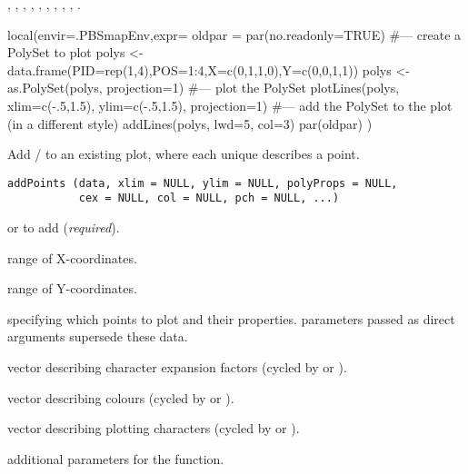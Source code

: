 \documentclass[letterpaper]{book}
\begin{document}
%
\begin{SeeAlso}\relax
{},
,
,
,
,
,
,
,
,
.
\end{SeeAlso}
%
\begin{Examples}
\begin{ExampleCode}
local(envir=.PBSmapEnv,expr={
  oldpar = par(no.readonly=TRUE)
  #--- create a PolySet to plot
  polys <- data.frame(PID=rep(1,4),POS=1:4,X=c(0,1,1,0),Y=c(0,0,1,1))
  polys <- as.PolySet(polys, projection=1)
  #--- plot the PolySet
  plotLines(polys, xlim=c(-.5,1.5), ylim=c(-.5,1.5), projection=1)
  #--- add the PolySet to the plot (in a different style)
  addLines(polys, lwd=5, col=3)
  par(oldpar)
})
\end{ExampleCode}
\end{Examples}
%
\begin{Description}\relax
Add / to an existing plot, where each
unique  describes a point.
\end{Description}
%
\begin{Usage}
\begin{verbatim}
addPoints (data, xlim = NULL, ylim = NULL, polyProps = NULL,
           cex = NULL, col = NULL, pch = NULL, ...)
\end{verbatim}
\end{Usage}
%
\begin{Arguments}
\begin{ldescription}
\item[\code{data}]  or  to add (\emph{required}).
\item[\code{xlim}] range of X-coordinates.
\item[\code{ylim}] range of Y-coordinates.
\item[\code{polyProps}]  specifying which points to plot and their
properties.   parameters passed as direct arguments
supersede these data.
\item[\code{cex}] vector describing character expansion factors (cycled by
 or ).
\item[\code{col}] vector describing colours (cycled by  or
).
\item[\code{pch}] vector describing plotting characters (cycled by 
or ).
\item[\code{...}] additional  parameters for the
 function.
\end{ldescription}
\end{Arguments}
\end{document}
